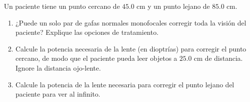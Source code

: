 \item Un paciente tiene un punto cercano de $45.0\text{ cm}$ y un punto lejano de $85.0\text{ cm}$.
\begin{enumerate}
    \item ¿Puede un solo par de gafas normales monofocales corregir toda la visión del paciente? Explique las opciones de tratamiento.
    \item Calcule la potencia necesaria de la lente (en dioptrías) para corregir el punto cercano, de modo que el paciente pueda leer objetos a $25.0\text{ cm}$ de distancia. Ignore la distancia ojo-lente.
    \item Calcule la potencia de la lente necesaria para corregir el punto lejano del paciente para ver al infinito.
\end{enumerate}